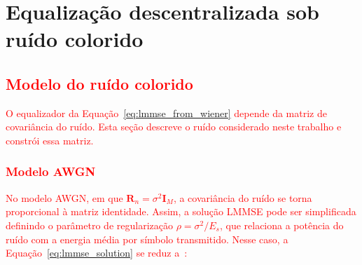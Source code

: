 

\chapter{Equalização descentralizada sob ruído colorido}\label{chap:dbp-ruido}

\section{\texorpdfstring{\textcolor{red}{Modelo do ruído colorido}}{Modelo do ruído colorido}}
\label{sec:ruido-colorido}

\textcolor{red}{O equalizador da Equação~{\hypersetup{linkcolor=red}\eqref{eq:lmmse_from_wiener}} depende da matriz de covariância do ruído. Esta seção descreve o ruído considerado neste trabalho e constrói essa matriz.}

\subsection{\texorpdfstring{\textcolor{red}{Modelo AWGN}}{Modelo AWGN}}

\textcolor{red}{No modelo AWGN, em que $\mathbf{R}_n = \sigma^2\mathbf{I}_M$, a covariância do ruído se torna proporcional à matriz identidade. Assim, a solução LMMSE pode ser simplificada definindo o parâmetro de regularização $\rho = \sigma^2/E_s$, que relaciona a potência do ruído com a energia média por símbolo transmitido. Nesse caso, a Equação~\eqref{eq:lmmse_solution} se reduz a~\cite{jeon2019}:}

